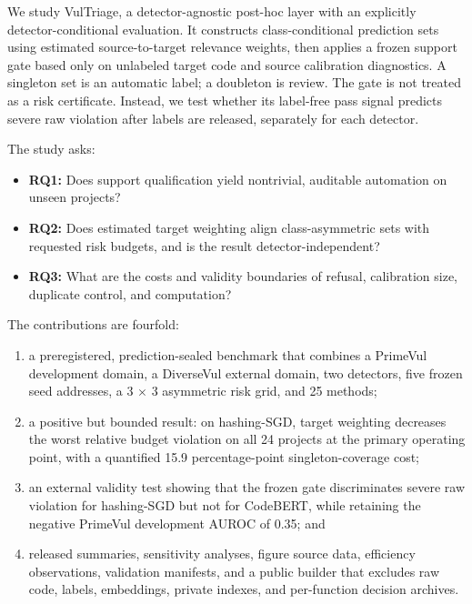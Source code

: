 \documentclass[research]{fcs}
\newcommand{\method}{VulTriage\xspace}
\begin{document}
We study \method, a detector-agnostic post-hoc layer with an explicitly detector-conditional evaluation. It constructs class-conditional prediction sets using estimated source-to-target relevance weights, then applies a frozen support gate based only on unlabeled target code and source calibration diagnostics. A singleton set is an automatic label; a doubleton is review. The gate is not treated as a risk certificate. Instead, we test whether its label-free pass signal predicts severe raw violation after labels are released, separately for each detector.

The study asks:

\begin{itemize}
  \item \textbf{RQ1:} Does support qualification yield nontrivial, auditable automation on unseen projects?
  \item \textbf{RQ2:} Does estimated target weighting align class-asymmetric sets with requested risk budgets, and is the result detector-independent?
  \item \textbf{RQ3:} What are the costs and validity boundaries of refusal, calibration size, duplicate control, and computation?
\end{itemize}

The contributions are fourfold:

\begin{enumerate}
  \item a preregistered, prediction-sealed benchmark that combines a PrimeVul development domain, a DiverseVul external domain, two detectors, five frozen seed addresses, a 3 $\times$ 3 asymmetric risk grid, and 25 methods;
  \item a positive but bounded result: on hashing-SGD, target weighting decreases the worst relative budget violation on all 24 projects at the primary operating point, with a quantified 15.9 percentage-point singleton-coverage cost;
  \item an external validity test showing that the frozen gate discriminates severe raw violation for hashing-SGD but not for CodeBERT, while retaining the negative PrimeVul development AUROC of 0.35; and
  \item released summaries, sensitivity analyses, figure source data, efficiency observations, validation manifests, and a public builder that excludes raw code, labels, embeddings, private indexes, and per-function decision archives.
\end{enumerate}
\end{document}
